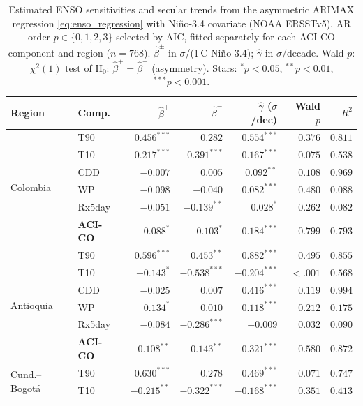 \documentclass[12pt]{article}
\begin{document}
\begin{table}[H]
\centering\footnotesize
\renewcommand{\arraystretch}{1.25}
\setlength{\tabcolsep}{4pt}
\caption{Estimated ENSO sensitivities and secular trends from the asymmetric ARIMAX regression
\eqref{eq:enso_regression} with Ni\~no-3.4 covariate (NOAA ERSSTv5),
AR order $p\in\{0,1,2,3\}$ selected by AIC, fitted separately for each ACI-CO component and region ($n=768$).
$\hat{\beta}^\pm$ in $\sigma$/(1\,\textdegree{}C Ni\~no-3.4); $\hat{\gamma}$ in $\sigma$/decade.
Wald $p$: $\chi^2(1)$ test of H$_0\!:\,\hat{\beta}^+=\hat{\beta}^-$ (asymmetry).
Stars: ${}^{*}p<0.05$, ${}^{**}p<0.01$, ${}^{***}p<0.001$.}
\label{tab:enso_sensitivity}
\begin{tabular}{@{}llrrrr r@{}}
\toprule
Region & Comp. & $\hat{\beta}^+$ & $\hat{\beta}^-$ & $\hat{\gamma}$ ($\sigma$/dec) & Wald $p$ & $R^2$ \\
\midrule
  \multirow{6}{*}{Colombia} & T90 & $0.456^{***}$ & $0.282$ & $0.554^{***}$ & $0.376$ & $0.811$ \\
   & T10 & $-0.217^{***}$ & $-0.391^{***}$ & $-0.167^{***}$ & $0.075$ & $0.538$ \\
   & CDD & $-0.007$ & $0.005$ & $0.092^{**}$ & $0.108$ & $0.969$ \\
   & WP & $-0.098$ & $-0.040$ & $0.082^{***}$ & $0.480$ & $0.088$ \\
   & Rx5day & $-0.051$ & $-0.139^{**}$ & $0.028^{*}$ & $0.262$ & $0.082$ \\
   & \textbf{ACI-CO} & $0.088^{*}$ & $0.103^{*}$ & $0.184^{***}$ & $0.799$ & $0.793$ \\
  \midrule
  \multirow{6}{*}{Antioquia} & T90 & $0.596^{***}$ & $0.453^{**}$ & $0.882^{***}$ & $0.495$ & $0.855$ \\
   & T10 & $-0.143^{*}$ & $-0.538^{***}$ & $-0.204^{***}$ & $<.001$ & $0.568$ \\
   & CDD & $-0.025$ & $0.007$ & $0.416^{***}$ & $0.119$ & $0.994$ \\
   & WP & $0.134^{*}$ & $0.010$ & $0.118^{***}$ & $0.212$ & $0.175$ \\
   & Rx5day & $-0.084$ & $-0.286^{***}$ & $-0.009$ & $0.032$ & $0.090$ \\
   & \textbf{ACI-CO} & $0.108^{**}$ & $0.143^{**}$ & $0.321^{***}$ & $0.580$ & $0.872$ \\
  \midrule
  \multirow{6}{*}{Cund.--Bogot\'a} & T90 & $0.630^{***}$ & $0.278$ & $0.469^{***}$ & $0.071$ & $0.747$ \\
   & T10 & $-0.215^{**}$ & $-0.322^{***}$ & $-0.168^{***}$ & $0.351$ & $0.413$ \\

\end{tabular}
\end{table}
\end{document}
